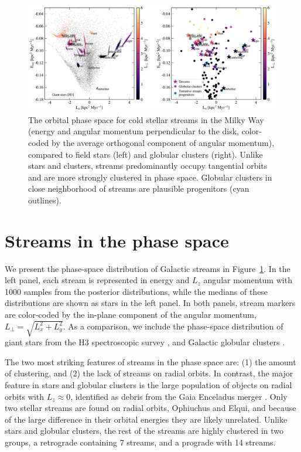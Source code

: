 \documentclass[twocolumn]{aastex63}
\begin{document}
\begin{figure}
\begin{center}
\includegraphics[width=\textwidth]{elz_streams.pdf}
\end{center}
\caption{The orbital phase space for cold stellar streams in the Milky Way (energy and angular momentum perpendicular to the disk, color-coded by the average orthogonal component of angular momentum), compared to field stars (left) and globular clusters (right).
Unlike stars and clusters, streams predominantly occupy tangential orbits and are more strongly clustered in phase space.
Globular clusters in close neighborhood of streams are plausible progenitors (cyan outlines).
}
\label{fig:elz}
\end{figure}

\section{Streams in the phase space}
\label{sec:elz}
We present the phase-space distribution of Galactic streams in Figure~\ref{fig:elz}.
In the left panel, each stream is represented in energy and $L_z$ angular momentum with 1000 samples from the posterior distributions, while the medians of these distributions are shown as stars in the left panel.
In both panels, stream markers are color-coded by the in-plane component of the angular momentum, $L_\perp=\sqrt{L_x^2+L_y^2}$.
As a comparison, we include the phase-space distribution of giant stars from the H3 spectroscopic survey \citep[small black points on the left,][]{conroy2019}, and Galactic globular clusters \citep[small circles, colored by $L_\perp$,][]{baumgardt2019}.

The two most striking features of streams in the phase space are: (1) the amount of clustering, and (2) the lack of streams on radial orbits.
In contrast, the major feature in stars and globular clusters is the large population of objects on radial orbits with $L_z\approx0$, identified as debris from the Gaia Enceladus merger \citep{belokurov2018, helmi2018, naidu2020}.
Only two stellar streams are found on radial orbits, Ophiuchus and Elqui, and because of the large difference in their orbital energies they are likely unrelated.
Unlike stars and globular clusters, the rest of the streams are highly clustered in two groups, a retrograde containing 7 streams, and a prograde with 14 streams.
\end{document}
